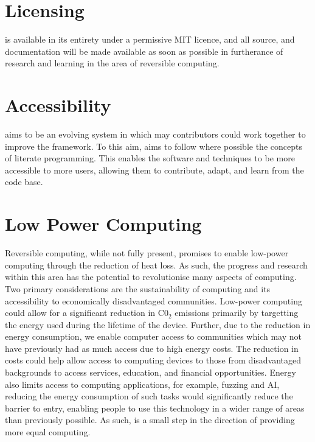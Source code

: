 \section{Licensing}

\rimp is available in its entirety under a permissive MIT licence, and all source, and documentation will be made available as soon as possible in furtherance of research and learning in the area of reversible computing.

\section{Accessibility}\label{Accessibility}

\rimp aims to be an evolving system in which may contributors could work together to improve the framework. To this aim, \rimp aims to follow where possible the concepts of literate programming\cite{LiterateProgramming}. This enables the software and techniques to be more accessible to more users, allowing them to contribute, adapt, and learn from the code base.

\section{Low Power Computing}\label{LPC}

Reversible computing, while not fully present, promises to enable low-power computing through the reduction of heat loss\cite{landauerIrreversibility}. As such, the progress and research within this area has the potential to revolutionise many aspects of computing. 
Two primary considerations are the sustainability of computing and its accessibility to economically disadvantaged communities.
Low-power computing could allow for a significant reduction in C0$_2$ emissions\cite{EnvironmentalComputing} primarily by targetting the energy used during the lifetime of the device.
Further, due to the reduction in energy consumption, we enable computer access to communities which may not have previously had as much access due to high energy costs. The reduction in costs could help allow access to computing devices to those from disadvantaged backgrounds\cite{USDigitalInequality, USRacialDigitalInequality} to access services, education, and financial opportunities\cite{DigitalInequalitySouth}. 
Energy also limits access to computing applications, for example, fuzzing\cite{GreenFuzzer} and AI\cite{sustainableAI}, reducing the energy consumption of such tasks would significantly reduce the barrier to entry, enabling people to use this technology in a wider range of areas than previously possible.
As such, \rimp is a small step in the direction of providing more equal computing.